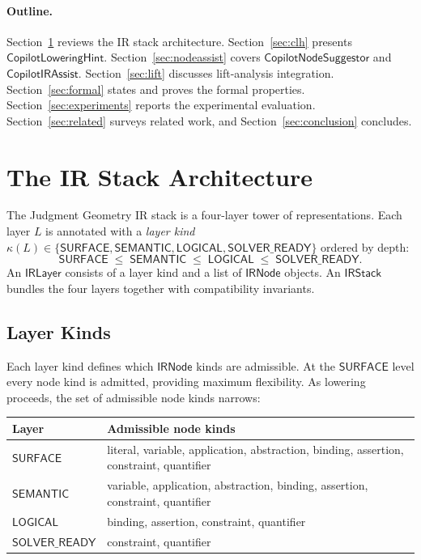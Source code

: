 \documentclass[11pt]{article}
\newcommand{\CLH}{\mathsf{CopilotLoweringHint}}
\newcommand{\CNS}{\mathsf{CopilotNodeSuggestor}}
\newcommand{\CIA}{\mathsf{CopilotIRAssist}}
\newcommand{\IRN}{\mathsf{IRNode}}
\newcommand{\IRL}{\mathsf{IRLayer}}
\newcommand{\IRS}{\mathsf{IRStack}}
\newcommand{\Surface}{\mathsf{SURFACE}}
\newcommand{\Semantic}{\mathsf{SEMANTIC}}
\newcommand{\Logical}{\mathsf{LOGICAL}}
\newcommand{\SolverReady}{\mathsf{SOLVER\_READY}}
\begin{document}
\paragraph{Outline.}
Section~\ref{sec:irstack} reviews the IR stack architecture.
Section~\ref{sec:clh} presents $\CLH$.
Section~\ref{sec:nodeassist} covers $\CNS$ and $\CIA$.
Section~\ref{sec:lift} discusses lift-analysis integration.
Section~\ref{sec:formal} states and proves the formal properties.
Section~\ref{sec:experiments} reports the experimental evaluation.
Section~\ref{sec:related} surveys related work, and
Section~\ref{sec:conclusion} concludes.

\section{The IR Stack Architecture}\label{sec:irstack}

The Judgment Geometry IR stack is a four-layer tower of
representations.  Each layer $L$ is annotated with a \emph{layer kind}
$\kappa(L) \in \{\Surface, \Semantic, \Logical, \SolverReady\}$
ordered by depth:
\[
  \Surface \;\le\; \Semantic \;\le\; \Logical \;\le\; \SolverReady.
\]
An $\IRL$ consists of a layer kind and a list of $\IRN$ objects.
An $\IRS$ bundles the four layers together with compatibility
invariants.

\subsection{Layer Kinds}\label{sec:layers}

Each layer kind defines which $\IRN$ kinds are admissible.  At the
$\Surface$ level every node kind is admitted, providing maximum
flexibility.  As lowering proceeds, the set of admissible node kinds
narrows:

\begin{center}
\begin{tabular}{l l}
\hline
\textbf{Layer} & \textbf{Admissible node kinds} \\
\hline
$\Surface$     & literal, variable, application, abstraction,
                  binding, assertion, constraint, quantifier \\
$\Semantic$    & variable, application, abstraction, binding,
                  assertion, constraint, quantifier \\
$\Logical$     & binding, assertion, constraint, quantifier \\
$\SolverReady$ & constraint, quantifier \\
\hline
\end{tabular}
\end{center}
\end{document}
